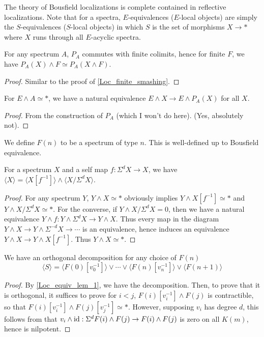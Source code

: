 	\begin{remark}
		The theory of Bousfield localizations is complete contained in reflective localizations. Note that for a spectra, $E$-equivalences ($E$-local objects) are simply the $S$-equivalences ($S$-local objects) in which $S$ is the set of morphisms $X\to *$ where $X$ runs through all $E$-acyclic spectra. 
	\end{remark}

	\begin{lemma}\label{Null_finite_smashing}
		For any spectrum $A$, $P_A$ commutes with finite colimits, hence for finite $F$, we have $P_A(X)\wedge F\simeq P_A(X\wedge F)$. 
	\end{lemma}
	\begin{proof}
		Similar to the proof of \cref{Loc_finite_smashing}. 
	\end{proof}

	\begin{lemma}\label{Null_prop_smash}
		For $E\wedge A\simeq*$, we have a natural equivalence $E\wedge X\to E\wedge P_A(X)$ for all $X$. 
	\end{lemma}
	\begin{proof}
		From the construction of $P_A$ (which I won't do here). (Yes, absolutely not). 
	\end{proof}

	\begin{defn}
		We define $F(n)$ to be a spectrum of type $n$. This is well-defined up to Bousfield equivalence. 
	\end{defn}

	\begin{lemma}\label{Loc_equiv_lem_1}
		For a spectrum $X$ and a self map $f:\Sigma^dX\to X$, we have $\langle X\rangle=\langle X[f^{-1}]\rangle\wedge\langle X/\Sigma^dX\rangle$. 
	\end{lemma}
	\begin{proof}
		For any spectrum $Y$, $Y\wedge X\simeq*$ obviously implies $Y\wedge X[f^{-1}]\simeq*$ and $Y\wedge X/\Sigma^dX\simeq*$. For the converse, if $Y\wedge X/\Sigma^dX=0$, then we have a natural equivalence $Y\wedge f:Y\wedge\Sigma^dX\to Y\wedge X$. Thus every map in the diagram $Y\wedge X\to Y\wedge\Sigma^{-d}X\to\cdots$ is an equivalence, hence induces an equivalence $Y\wedge X\to Y\wedge X[f^{-1}]$. Thus $Y\wedge X\simeq*$. 
	\end{proof}

	\begin{lemma}\label{Loc_equiv_lem_2}
		We have an orthogonal decomposition for any choice of $F(n)$
		\[ \langle S\rangle=\langle F(0)[v_0^{-1}]\rangle\vee\cdots\vee\langle F(n)[v_n^{-1}]\rangle\vee\langle F(n+1)\rangle \]
	\end{lemma}
	\begin{proof}
		By \cref{Loc_equiv_lem_1}, we have the decomposition. Then, to prove that it is orthogonal, it suffices to prove for $i<j$, $F(i)[v_i^{-1}]\wedge F(j)$ is contractible, so that $F(i)[v_i^{-1}]\wedge F(j)[v_j^{-1}]\simeq*$. However, supposing $v_i$ has degree $d$, this follows from that $v_i\wedge\operatorname{\mathrm{id}}:\Sigma^dF(i)\wedge F(j)\to F(i)\wedge F(j)$ is zero on all $K(m)$, hence is nilpotent. 
	\end{proof}

